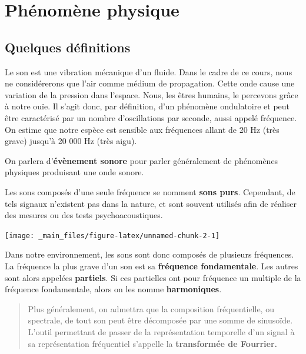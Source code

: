 \documentclass[
]{book}
\begin{document}
\hypertarget{phuxe9nomuxe8ne-physique}{%
\section{Phénomène physique}\label{phuxe9nomuxe8ne-physique}}

\hypertarget{quelques-duxe9finitions}{%
\subsection{Quelques définitions}\label{quelques-duxe9finitions}}

Le son est une vibration mécanique d'un fluide. Dans le cadre de ce cours, nous ne considérerons que l'air comme médium de propagation. Cette onde cause une variation de la pression dans l'espace. Nous, les êtres humains, le percevons grâce à notre ouïe. Il s'agit donc, par définition, d'un phénomène ondulatoire et peut être caractérisé par un nombre d'oscillations par seconde, aussi appelé fréquence. On estime que notre espèce est sensible aux fréquences allant de 20 Hz (très grave) jusqu'à 20 000 Hz (très aigu).

On parlera d'\textbf{évènement sonore} pour parler généralement de phénomènes physiques produisant une onde sonore.

Les sons composés d'une seule fréquence se nomment \textbf{sons purs}. Cependant, de tels signaux n'existent pas dans la nature, et sont souvent utilisés afin de réaliser des mesures ou des tests psychoacoustiques.

\begin{center}\texttt{[image: \_main\_files/figure-latex/unnamed-chunk-2-1]} \end{center}

Dans notre environnement, les sons sont donc composés de plusieurs fréquences. La fréquence la plus grave d'un son est sa \textbf{fréquence fondamentale}. Les autres sont alors appelées \textbf{partiels}. Si ces partielles ont pour fréquence un multiple de la fréquence fondamentale, alors on les nomme \textbf{harmoniques}.

\begin{quote}
Plus généralement, on admettra que la composition fréquentielle, ou spectrale, de tout son peut être décomposée par une somme de sinusoïde. L'outil permettant de passer de la représentation temporelle d'un signal à sa représentation fréquentiel s'appelle la \textbf{transformée de Fourrier.}
\end{quote}
\end{document}
